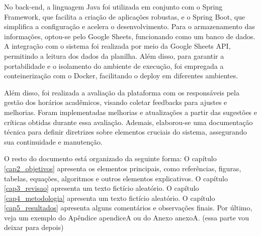 No back-end, a linguagem Java foi utilizada em conjunto com o Spring Framework, que facilita a criação de aplicações robustas, e o Spring Boot, que simplifica a configuração e acelera o desenvolvimento. Para o armazenamento das informações, optou-se pelo Google Sheets, funcionando como um banco de dados. A integração com o sistema foi realizada por meio da Google Sheets API, permitindo a leitura dos dados da planilha. Além disso, para garantir a portabilidade e o isolamento do ambiente de execução, foi empregada a conteinerização com o Docker, facilitando o deploy em diferentes ambientes.

Além disso, foi realizada a avaliação da plataforma com os responsáveis pela gestão dos horários acadêmicos, visando coletar feedbacks para ajustes e melhorias. Foram implementadas melhorias e atualizações a partir das sugestões e críticas obtidas durante essa avaliação. Ademais, elaborou-se uma documentação técnica para definir diretrizes sobre elementos cruciais do sistema, assegurando sua continuidade e manutenção.

O resto do documento está organizado da seguinte forma: O capítulo \ref{cap2_objetivos} apresenta os elementos principais, como referências, figuras, tabelas, equações, algoritmos e outros elementos explicativos. O capítulo \ref{cap3_revisao} apresenta um texto fictício aleatório. O capítulo \ref{cap4_metodologia} apresenta um texto fictício aleatório. O capítulo \ref{cap5_resultados} apresenta alguns comentários e observações finais. Por último, veja um exemplo do Apêndice apendiceA ou do Anexo anexoA. (essa parte vou deixar para depois)


